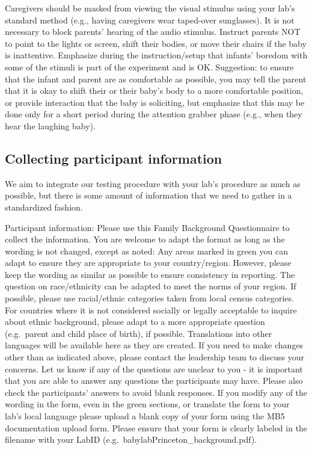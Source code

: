 \documentclass[
  letterpaper,
  DIV=11,
  numbers=noendperiod,
  oneside]{scrreprt}
\begin{document}
Caregivers should be masked from viewing the visual stimulus using your
lab's standard method (e.g., having caregivers wear taped-over
sunglasses). It is not necessary to block parents' hearing of the audio
stimulus. Instruct parents NOT to point to the lights or screen, shift
their bodies, or move their chairs if the baby is inattentive. Emphasize
during the instruction/setup that infants' boredom with some of the
stimuli is part of the experiment and is OK. Suggestion: to ensure that
the infant and parent are as comfortable as possible, you may tell the
parent that it is okay to shift their or their baby's body to a more
comfortable position, or provide interaction that the baby is
soliciting, but emphasize that this may be done only for a short period
during the attention grabber phase (e.g., when they hear the laughing
baby).

\subsection{Collecting participant
information}\label{collecting-participant-information-1}

We aim to integrate our testing procedure with your lab's procedure as
much as possible, but there is some amount of information that we need
to gather in a standardized fashion.

Participant information: Please use this Family Background Questionnaire
to collect the information. You are welcome to adapt the format as long
as the wording is not changed, except as noted: Any areas marked in
green you can adapt to ensure they are appropriate to your
country/region. However, please keep the wording as similar as possible
to ensure consistency in reporting. The question on race/ethnicity can
be adapted to meet the norms of your region. If possible, please use
racial/ethnic categories taken from local census categories. For
countries where it is not considered socially or legally acceptable to
inquire about ethnic background, please adapt to a more appropriate
question (e.g.~parent and child place of birth), if possible.
Translations into other languages will be available here as they are
created. If you need to make changes other than as indicated above,
please contact the leadership team to discuss your concerns. Let us know
if any of the questions are unclear to you - it is important that you
are able to answer any questions the participants may have. Please also
check the participants' answers to avoid blank responses. If you modify
any of the wording in the form, even in the green sections, or translate
the form to your lab's local language please upload a blank copy of your
form using the MB5 documentation upload form. Please ensure that your
form is clearly labeled in the filename with your LabID
(e.g.~babylabPrinceton\_background.pdf).
\end{document}
